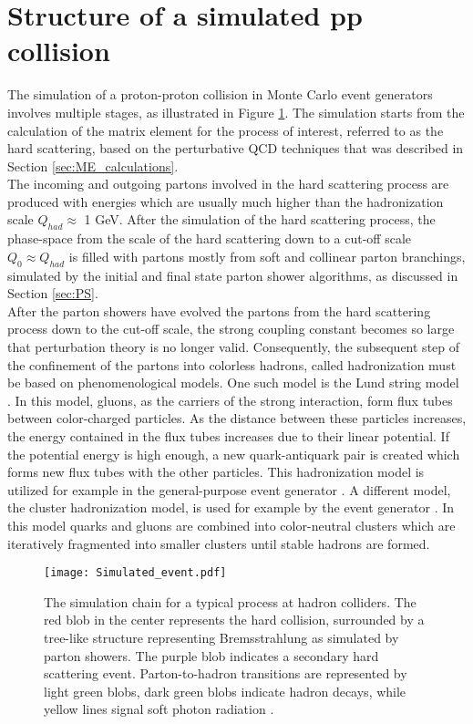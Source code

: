 \section{\label{sec:pp_collisions}Structure of a simulated pp collision}
\noindent The simulation of a proton-proton collision in Monte Carlo event generators involves multiple stages, as illustrated in Figure \ref{fig:Simulated_event}. The simulation starts from the calculation of the matrix element for the process of interest, referred to as the hard scattering, based on the perturbative QCD techniques that was described in Section \ref{sec:ME_calculations}.\\
\indent The incoming and outgoing partons involved in the hard scattering process are produced with energies which are usually much higher than the hadronization scale $Q_{had} \approx$ 1 GeV. After the simulation of the hard scattering process, the phase-space from the scale of the hard scattering down to a cut-off scale $Q_0 \approx Q_{had}$ is filled with partons mostly from soft and collinear parton branchings, simulated by the initial and final state parton shower algorithms, as discussed in Section \ref{sec:PS}.\\
\indent After the parton showers have evolved the partons from the hard scattering process down to the cut-off scale, the strong coupling constant becomes so large that perturbation theory is no longer valid. Consequently, the subsequent step of the confinement of the partons into colorless hadrons, called hadronization must be based on phenomenological models. One such model is the Lund string model \cite{Lund_model}. In this model, gluons, as the carriers of the strong interaction, form flux tubes between color-charged particles. As the distance between these particles increases, the energy contained in the flux tubes increases due to their linear potential. If the potential energy is high enough, a new quark-antiquark pair is created which forms new flux tubes with the other particles. This hadronization model is utilized for example in the {\selectfont{Pythia}} general-purpose event generator \cite{Pythia}. A different model, the cluster hadronization model, is used for example by the {\selectfont{Herwig}} event generator \cite{Herwig}. In this model quarks and gluons are combined into color-neutral clusters which are iteratively fragmented into smaller clusters until stable hadrons are formed.

\begin{figure}[htb!]
    \centering
    \texttt{[image: Simulated\_event.pdf]}
    \caption{The simulation chain for a typical process at hadron colliders. The red blob in the center represents the hard collision, surrounded by a tree-like structure representing Bremsstrahlung as simulated by parton showers. The purple blob indicates a secondary hard scattering event. Parton-to-hadron transitions are represented by light green blobs, dark green blobs indicate hadron decays, while yellow lines signal soft photon radiation  \cite{2015introduction}.}
    \label{fig:Simulated_event}
\end{figure}
